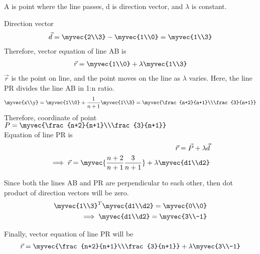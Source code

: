 \documentclass[journal,12pt,twocolumn]{IEEEtran}
\begin{document}
A is point where the line passes, d is direction vector, and $\lambda$ is constant. 

Direction vector 
\begin{align}
\vec{d} = \myvec{2\\3}-\myvec{1\\0} = \myvec{1\\3}
\end{align}
Therefore, vector equation of line AB is 
\begin{align}
\vec{r}=\myvec{1\\0}+\lambda\myvec{1\\3}
\end{align}
 $\vec{r}$ is the point on line, and the point moves on the line as $\lambda$ varies. Here, the line PR divides the line AB in 1:n ratio. 
\begin{align}
\myvec{x\\y} = \myvec{1\\0}+\frac{1}{n+1}\myvec{1\\3} = \myvec{\frac{n+2}{n+1}\\\frac{3}{n+1}}
\end{align}
Therefore, coordinate of point $P=\myvec{\frac{n+2}{n+1}\\\frac{3}{n+1}}$
\\
Equation of line PR is 
\begin{align}
\vec{r}=\vec{P}+\lambda\vec{d}\\
\implies \vec{r}=\myvec{\frac{n+2}{n+1}\frac{3}{n+1}}+\lambda\myvec{d1\\d2}
\end{align}

Since both the lines AB and PR are perpendicular to each other, then dot product of direction vectors will be zero.
\begin{align}
\myvec{1\\3}^T\myvec{d1\\d2}=\myvec{0\\0} \\
\implies  \myvec{d1\\d2} = \myvec{3\\-1}
\end{align}

Finally, vector equation of line PR will be
\begin{align}
\vec{r}=\myvec{\frac{n+2}{n+1}\\\frac{3}{n+1}}+\lambda\myvec{3\\-1}
\end{align}
\end{document}

